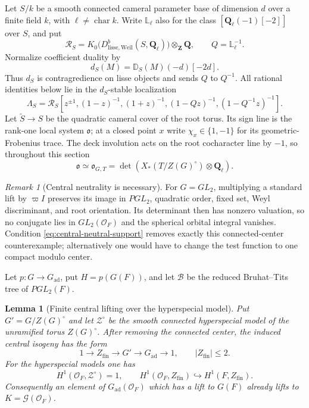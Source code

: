\documentclass[11pt]{article}
\newtheorem{lemma}[theorem]{Lemma}
\theoremstyle{definition}
\theoremstyle{remark}
\newtheorem{remark}[theorem]{Remark}
\newcommand{\Qell}{\mathbf Q_\ell}
\newcommand{\Lell}{\mathbb L_{\ell}}
\newcommand{\D}{\mathbb D}
\newcommand{\ad}{\mathrm{ad}}
\newcommand{\cO}{\mathcal O}
\begin{document}
Let $S/k$ be a smooth connected cameral parameter base of dimension $d$ over
a finite field $k$, with $\ell\ne\operatorname{char}k$.  Write $\Lell$ also
for the class $[\Qell(-1)[-2]]$ over $S$, and put
\[
 \mathcal R_S
 =K_0\bigl(D^b_{\mathrm{lisse,Weil}}(S,\Qell)\bigr)
  \otimes_{\mathbf Z}\mathbf Q,
 \qquad Q=\Lell^{-1}.
\]
Normalize coefficient duality by
\begin{equation}
 d_S(M)=\D_S(M)(-d)[-2d].
 \label{eq:A1-normalized-duality}
\end{equation}
Thus $d_S$ is contragredience on lisse objects and sends $Q$ to $Q^{-1}$.
All rational identities below lie in the $d_S$-stable localization
\begin{equation}
 \Lambda_S
 =\mathcal R_S[z^{\pm1},
 (1-z)^{-1},(1+z)^{-1},
 (1-Qz)^{-1},(1-Q^{-1}z)^{-1}].
 \label{eq:A1-localization}
\end{equation}
Let $\widetilde S\to S$ be the quadratic cameral cover of the root torus.
Its sign line is the rank-one local system $\mathfrak o$; at a closed point
$x$ write $\chi_x\in\{1,-1\}$ for its geometric-Frobenius trace.  The deck
involution acts on the root cocharacter line by $-1$, so throughout this
section
\begin{equation}
 \mathfrak o\simeq\mathfrak o_{G,T}
 =\det\!\left(X_*(T/Z(G)^\circ)\otimes\Qell\right).
 \label{eq:A1-cameral-orientation}
\end{equation}

\begin{remark}[Central neutrality is necessary]
\label{rem:central-neutral-necessary}
For $G=GL_2$, multiplying a standard lift by $\varpi I$ preserves its image
in $PGL_2$, quadratic order, fixed set, Weyl discriminant, and root
orientation.  Its determinant then has nonzero valuation, so no conjugate
lies in $GL_2(\cO_F)$ and the spherical orbital integral vanishes.  Condition
\eqref{eq:central-neutral-support} removes exactly this connected-center
counterexample; alternatively one would have to change the test function to
one compact modulo center.
\end{remark}

Let $p:G\to G_{\ad}$, put $H=p(G(F))$, and let $\mathscr B$ be the reduced
Bruhat--Tits tree of $PGL_2(F)$.

\begin{lemma}[Finite central lifting over the hyperspecial model]
\label{lem:A1-central-lifting}
Put $G'=G/Z(G)^\circ$ and let $\mathcal Z^\circ$ be the smooth connected
hyperspecial model of the unramified torus $Z(G)^\circ$.  After removing the connected center, the induced
central isogeny has the form
\begin{equation}
 1\longrightarrow Z_{\mathrm{fin}}
 \longrightarrow G'\longrightarrow G_{\ad}\longrightarrow1,
 \qquad |Z_{\mathrm{fin}}|\le2.
 \label{eq:A1-finite-central-isogeny}
\end{equation}
For the hyperspecial models one has
\[
 H^1(\cO_F,\mathcal Z^\circ)=1,
 \qquad
 H^1(\cO_F,Z_{\mathrm{fin}})\hookrightarrow H^1(F,Z_{\mathrm{fin}}).
\]
Consequently an element of $G_{\ad}(\cO_F)$ which has a lift to $G(F)$
already lifts to $K=\mathcal G(\cO_F)$.
\end{lemma}
\end{document}
